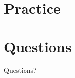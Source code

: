 \documentclass[table]{beamer}
\numberwithin{equation}{subsection}
\numberwithin{theorem}{subsection}
\begin{document}




\section{Practice}


\section{Questions}
\begin{frame}
\Huge{\centerline{Questions?}}
\end{frame}

\end{document}
